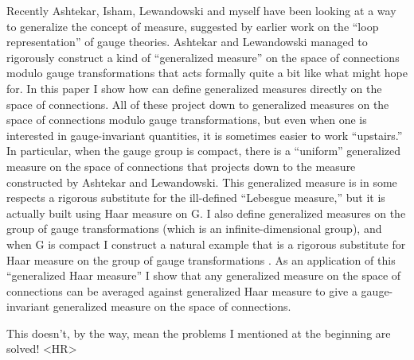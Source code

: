 Recently Ashtekar, Isham, Lewandowski and myself have been looking at a
way to generalize the concept of measure, suggested by earlier work on
the ``loop representation'' of gauge theories.  Ashtekar and Lewandowski
managed to rigorously construct a kind of ``generalized measure'' on the
space of connections modulo gauge transformations that acts formally
quite a bit like what might hope for.  In this paper I show how can
define generalized measures directly on the space of connections.  All
of these project down to generalized measures on the space of
connections modulo gauge transformations, but even when one is
interested in gauge-invariant quantities, it is sometimes easier to work
``upstairs.''  In particular, when the gauge group is compact, there is
a ``uniform'' generalized measure on the space of connections that
projects down to the measure constructed by Ashtekar and Lewandowski.
This generalized measure is in some respects a rigorous substitute for
the ill-defined ``Lebesgue measure,'' but it is actually built using
Haar measure on G.  I also define generalized measures on the group of
gauge transformations (which is an infinite-dimensional group), and when
G is compact I construct a natural example that is a rigorous substitute
for Haar measure on the group of gauge transformations .  As an
application of this ``generalized Haar measure'' I show that any
generalized measure on the space of connections can be averaged against
generalized Haar measure to give a gauge-invariant generalized measure
on the space of connections.

This doesn't, by the way, mean the problems I mentioned at the beginning
are solved!
<HR>



